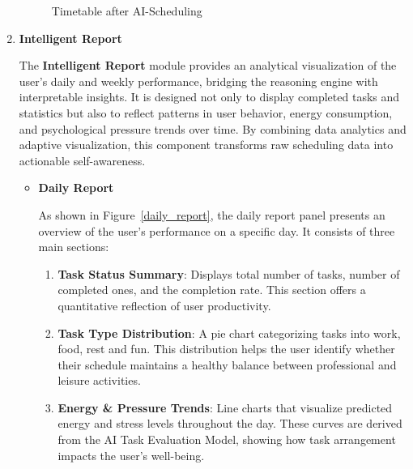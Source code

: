 \documentclass[12pt, a4paper]{article}
\begin{document}
\begin{enumerate}
\begin{figure}[H]
\begin{minipage}[t]{0.49\textwidth}
                            \caption{Timetable after AI-Scheduling}
                            \label{aft_scheduling}
                        \end{minipage}
                    \end{figure}

                \item \textbf{Intelligent Report}
                                
                    The \textbf{Intelligent Report} module provides an analytical visualization of the user’s daily and weekly performance, bridging the reasoning engine with interpretable insights. It is designed not only to display completed tasks and statistics but also to reflect patterns in user behavior, energy consumption, and psychological pressure trends over time. By combining data analytics and adaptive visualization, this component transforms raw scheduling data into actionable self-awareness. 
    
                    \begin{itemize}
                        \item \textbf{Daily Report}
    
                            As shown in Figure~\ref{daily_report}, the daily report panel presents an overview of the user's performance on a specific day. It consists of three main sections:
                        
                            \begin{enumerate}
                                \item \textbf{Task Status Summary}: Displays total number of tasks, number of completed ones, and the completion rate. This section offers a quantitative reflection of user productivity.
                                \item \textbf{Task Type Distribution}: A pie chart categorizing tasks into work, food, rest and fun. This distribution helps the user identify whether their schedule maintains a healthy balance between professional and leisure activities.
                                \item \textbf{Energy \& Pressure Trends}: Line charts that visualize predicted energy and stress levels throughout the day. These curves are derived from the AI Task Evaluation Model, showing how task arrangement impacts the user’s well-being.
                            \end{enumerate}
            

\end{itemize}
\end{enumerate}
\end{document}
